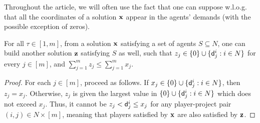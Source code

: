 \documentclass{article}
\begin{document}
Throughout the article, we will often use the fact that one can suppose %
w.l.o.g. that all the coordinates of a solution ${\bf x}$ appear in the agents'  demands (with the possible exception of zeros).


\begin{observation} \label{obs2} For all $\tau \in [1,m]$, from a solution ${\bf x}$ satisfying a set of agents $S \subseteq N$, %
one can build another solution ${\bf z}$ satisfying $S$ as well, such that $z_j \in \{0\} \cup \{{\sf d}^i_j: i\in N\}$ for every $j \in [m]$, and $\sum_{j=1}^m z_j \leq  \sum_{j=1}^m x_j$.   
\end{observation}
\begin{proof} For each $j \in [m]$, proceed as follows. If $x_j \in \{0\} \cup \{{\sf d}^i_j: i\in N\}$, then $z_j=x_j$. Otherwise, $z_j$ is given the largest value in $\{0\} \cup \{{\sf d}^i_j: i\in N\}$ which does not exceed $x_j$. Thus, it cannot be $z_j < {\sf d}_j^i \le x_j$ for any player-project pair $(i,j) \in N \times [m]$, meaning that players satisfied by ${\bf x}$ are also satisfied by ${\bf z}$.      
\end{proof}









\end{document}
